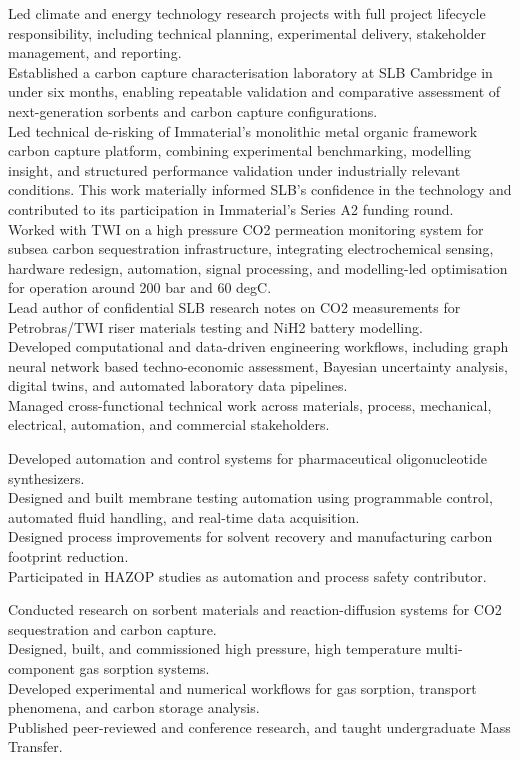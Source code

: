 \documentclass{../../templates/karthicv-single}
\begin{document}
{Led climate and energy technology research projects with full project lifecycle responsibility, including technical planning, experimental delivery, stakeholder management, and reporting.\\
Established a carbon capture characterisation laboratory at SLB Cambridge in under six months, enabling repeatable validation and comparative assessment of next-generation sorbents and carbon capture configurations.\\
Led technical de-risking of Immaterial's monolithic metal organic framework carbon capture platform, combining experimental benchmarking, modelling insight, and structured performance validation under industrially relevant conditions. This work materially informed SLB's confidence in the technology and contributed to its participation in Immaterial's Series A2 funding round.\\
Worked with TWI on a high pressure CO2 permeation monitoring system for subsea carbon sequestration infrastructure, integrating electrochemical sensing, hardware redesign, automation, signal processing, and modelling-led optimisation for operation around 200 bar and 60 degC.\\
Lead author of confidential SLB research notes on CO2 measurements for Petrobras/TWI riser materials testing and NiH2 battery modelling.\\
Developed computational and data-driven engineering workflows, including graph neural network based techno-economic assessment, Bayesian uncertainty analysis, digital twins, and automated laboratory data pipelines.\\
Managed cross-functional technical work across materials, process, mechanical, electrical, automation, and commercial stakeholders.}

{Developed automation and control systems for pharmaceutical oligonucleotide synthesizers.\\
Designed and built membrane testing automation using programmable control, automated fluid handling, and real-time data acquisition.\\
Designed process improvements for solvent recovery and manufacturing carbon footprint reduction.\\
Participated in HAZOP studies as automation and process safety contributor.}

{Conducted research on sorbent materials and reaction-diffusion systems for CO2 sequestration and carbon capture.\\
Designed, built, and commissioned high pressure, high temperature multi-component gas sorption systems.\\
Developed experimental and numerical workflows for gas sorption, transport phenomena, and carbon storage analysis.\\
Published peer-reviewed and conference research, and taught undergraduate Mass Transfer.}
\end{document}
